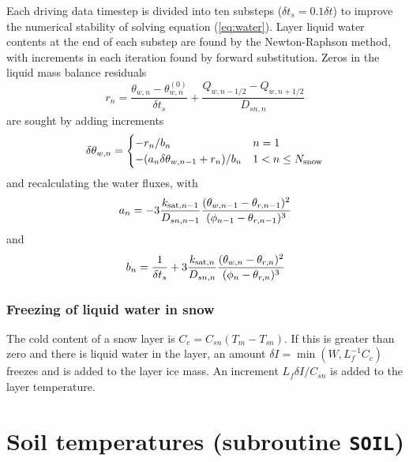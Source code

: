 \documentclass[fleqn]{article}
\begin{document}
Each driving data timestep is divided into ten substeps ($\delta t_s = 0.1\delta t$) to improve the numerical stability of solving equation (\ref{eq:water}). Layer liquid water contents at the end of each substep are found by the Newton-Raphson method, with increments in each iteration found by forward substitution. Zeros in the liquid mass balance residuals
\begin{equation}
r_n = \frac{\theta_{w,n} - \theta_{w,n}^{(0)}}{\delta t_s} + \frac{Q_{w,n-1/2} - Q_{w,n+1/2}}{D_{sn,n}}
\end{equation}
are sought by adding increments
\begin{equation}
\delta\theta_{w,n} = 
\begin{cases}
   -r_n/b_n                           & n = 1 \\
  -(a_n\delta\theta_{w,n-1}+r_n)/b_n  & 1 < n \leq N_{\rm snow}
\end{cases}
\end{equation}
and recalculating the water fluxes, with
\begin{equation}
a_n = -3\frac{k_{{\rm sat},n-1}}{D_{sn,n-1}}\frac{(\theta_{w,n-1} - \theta_{r,n-1})^2}{(\phi_{n-1} - \theta_{r,n-1})^3}
\end{equation}
and
\begin{equation}
b_n = \frac{1}{\delta t_s} + 3\frac{k_{{\rm sat},n}}{D_{sn,n}}\frac{(\theta_{w,n} - \theta_{r,n})^2}{(\phi_n - \theta_{r,n})^3}
\end{equation}


\subsubsection{Freezing of liquid water in snow}
The cold content of a snow layer is $C_c = C_{sn}(T_m - T_{sn})$. If this is greater than zero and there is liquid water in the layer, an amount $\delta I = \min(W,L_f^{-1}C_c)$ freezes and is added to the layer ice mass. An increment $L_f\delta I/C_{sn}$ is added to the layer temperature.


\section{Soil temperatures (subroutine {\tt SOIL})}
\end{document}
